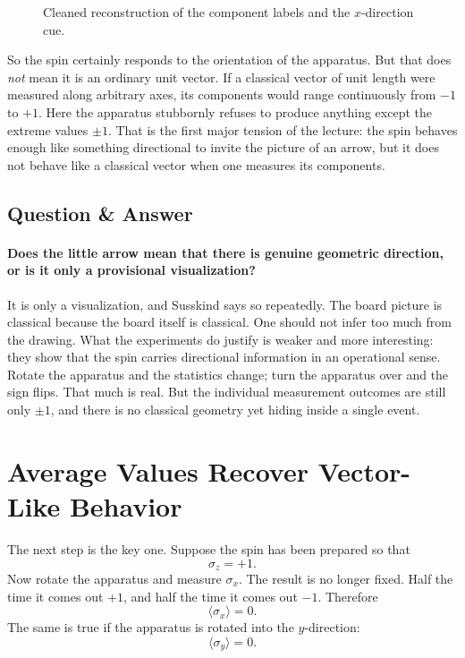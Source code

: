 \begin{figure}
\centering
{}
\caption{Cleaned reconstruction of the component labels and the \(x\)-direction cue.}
\end{figure}

So the spin certainly responds to the orientation of the apparatus. But that does \emph{not} mean it is an ordinary unit vector. If a classical vector of unit length were measured along arbitrary axes, its components would range continuously from \(-1\) to \(+1\). Here the apparatus stubbornly refuses to produce anything except the extreme values \(\pm1\). That is the first major tension of the lecture: the spin behaves enough like something directional to invite the picture of an arrow, but it does not behave like a classical vector when one measures its components.

\subsection{Question \& Answer}

\paragraph{Does the little arrow mean that there is genuine geometric direction, or is it only a provisional visualization?}

It is only a visualization, and Susskind says so repeatedly. The board picture is classical because the board itself is classical. One should not infer too much from the drawing. What the experiments do justify is weaker and more interesting: they show that the spin carries directional information in an operational sense. Rotate the apparatus and the statistics change; turn the apparatus over and the sign flips. That much is real. But the individual measurement outcomes are still only \(\pm1\), and there is no classical geometry yet hiding inside a single event.

\section{Average Values Recover Vector-Like Behavior}

The next step is the key one. Suppose the spin has been prepared so that
\[
\sigma_z=+1.
\]
Now rotate the apparatus and measure \(\sigma_x\). The result is no longer fixed. Half the time it comes out \(+1\), and half the time it comes out \(-1\). Therefore
\begin{equation}
\langle \sigma_x\rangle=0.
\end{equation}
The same is true if the apparatus is rotated into the \(y\)-direction:
\begin{equation}
\langle \sigma_y\rangle=0.
\end{equation}

